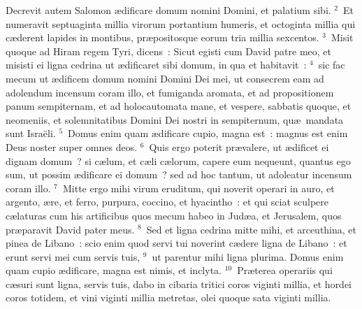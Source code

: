 \lettrine[lines=10,image=true,loversize=0.05,lraise=-0.03]{D}{}ecrevit autem Salomon \ae dificare domum nomini Domini, et palatium sibi.
${}^{2}$~Et numeravit septuaginta millia virorum portantium humeris, et octoginta millia qui c\ae derent lapides in montibus, pr\ae positosque eorum tria millia sexcentos.
${}^{3}$~Misit quoque ad Hiram regem Tyri, dicens~: Sicut egisti cum David patre meo, et misisti ei ligna cedrina ut \ae dificaret sibi domum, in qua et habitavit~:
${}^{4}$~sic fac mecum ut \ae dificem domum nomini Domini Dei mei, ut consecrem eam ad adolendum incensum coram illo, et fumiganda aromata, et ad propositionem panum sempiternam, et ad holocautomata mane, et vespere, sabbatis quoque, et neomeniis, et solemnitatibus Domini Dei nostri in sempiternum, qu\ae\ mandata sunt Isra\"eli.
${}^{5}$~Domus enim quam \ae dificare cupio, magna est~: magnus est enim Deus noster super omnes deos.
${}^{6}$~Quis ergo poterit pr\ae valere, ut \ae dificet ei dignam domum~? si c\ae lum, et c\ae li c\ae lorum, capere eum nequeunt, quantus ego sum, ut possim \ae dificare ei domum~? sed ad hoc tantum, ut adoleatur incensum coram illo.
${}^{7}$~Mitte ergo mihi virum eruditum, qui noverit operari in auro, et argento, \ae re, et ferro, purpura, coccino, et hyacintho~: et qui sciat sculpere c\ae laturas cum his artificibus quos mecum habeo in Jud\ae a, et Jerusalem, quos pr\ae paravit David pater meus.
${}^{8}$~Sed et ligna cedrina mitte mihi, et arceuthina, et pinea de Libano~: scio enim quod servi tui noverint c\ae dere ligna de Libano~: et erunt servi mei cum servis tuis,
${}^{9}$~ut parentur mihi ligna plurima. Domus enim quam cupio \ae dificare, magna est nimis, et inclyta.
${}^{10}$~Pr\ae terea operariis qui c\ae suri sunt ligna, servis tuis, dabo in cibaria tritici coros viginti millia, et hordei coros totidem, et vini viginti millia metretas, olei quoque sata viginti millia.


